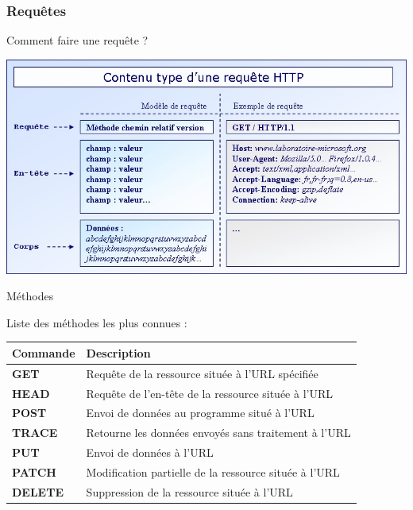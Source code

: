 \subsubsection{Requêtes}


\begin{frame}{Comment faire une requête ?}
	
    \begin{center}
        \includegraphics[width=1\textwidth]{img_http/requete.jpg}
    \end{center}

\end{frame}


\begin{frame}{Méthodes}

Liste des méthodes les plus connues :

\vspace{2em}

\begin{table}[h]
\begin{tabular}{|l|l|}
\hline
   Commande & Description\\ \hline \hline
   \textbf{GET} & Requête de la ressource située à l'URL spécifiée\\ \hline
   \textbf{HEAD} & Requête de l'en-tête de la ressource située à l'URL\\ \hline
   \textbf{POST} & Envoi de données au programme situé à l'URL\\ \hline
   \textbf{TRACE} & Retourne les données envoyés sans traitement à l'URL\\ \hline
   \textbf{PUT} & Envoi de données à l'URL\\ \hline
   \textbf{PATCH} & Modification partielle de la ressource située à l'URL\\ \hline
   \textbf{DELETE} & Suppression de la ressource située à l'URL\\ \hline
\end{tabular}
\end{table}

\end{frame}



